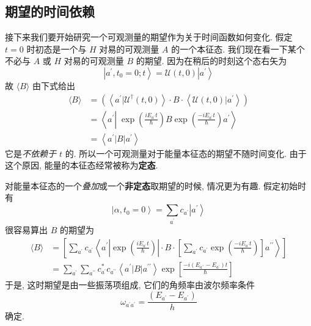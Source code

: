 \documentclass[lang=cn,newtx,10pt,scheme=chinese,thmcnt=section]{elegantbook}
\begin{document}
\subsection*{期望的时间依赖}
接下来我们要开始研究一个可观测量的期望作为关于时间函数如何变化. 假定 $t = 0$ 时初态是一个与 $H$ 对易的可观测量 $A$ 的一个本征态. 我们现在看一下某个不必与 $A$ 或 $H$ 对易的可观测量 $B$ 的期望. 因为在稍后的时刻这个态右矢为
\begin{equation}
	\left| {{a}^{\prime },{t}_{0} = 0;t}\right\rangle = \mathcal{U}\left( {t,0}\right) \left| {a}^{\prime }\right\rangle
\end{equation}
故 $\langle B\rangle$ 由下式给出
\begin{equation}
	\begin{aligned}
		\langle B\rangle &= \left( {\left\langle {{a}^{\prime } | {\mathcal{U}}^{\dagger}\left( {t,0}\right) }\right\rangle \cdot B \cdot \left\langle {\mathcal{U}\left( {t,0}\right) | {a}^{\prime }}\right\rangle }\right)\\
		&= \left\langle {{a}^{\prime }\left| {\;\exp \left( \frac{i{E}_{{a}^{\prime }}t}{\hbar }\right) B\exp \left( \frac{-i{E}_{{a}^{\prime }}t}{\hbar }\right) }\right. {a}^{\prime }}\right\rangle\\
		&= \left\langle {{a}^{\prime }\left| B\right| {a}^{\prime }}\right\rangle
	\end{aligned}
\end{equation}
它是\textit{不依赖于 $t$} 的. 所以一个可观测量对于能量本征态的期望不随时间变化. 由于这个原因, 能量的本征态经常被称为\textbf{定态}.

对能量本征态的一个\textit{叠加}或一个\textbf{非定态}取期望的时候, 情况更为有趣. 假定初始时有
\begin{equation}
	\left| {\alpha ,{t}_{0} = 0}\right\rangle = \mathop{\sum }\limits_{{a}^{\prime }}{c}_{{a}^{\prime }}\left| {a}^{\prime }\right\rangle
\end{equation}
很容易算出 $B$ 的期望为
\begin{equation}
	\begin{aligned}
		\langle B\rangle &= \left\lbrack {\mathop{\sum }\limits_{{a}^{\prime }}{c}_{{a}^{\prime }}\left\langle {{a}^{\prime }\left| {\exp \left( \frac{i{E}_{{a}^{\prime }}t}{\hbar }\right) }\right| \cdot B \cdot \left\lbrack {\mathop{\sum }\limits_{{a}^{\prime }}{c}_{{a}^{\prime }}\exp \left( \frac{-i{E}_{{a}^{\prime }}t}{\hbar }\right) }\right\rbrack {a}^{\prime \prime }}\right\rangle }\right\rbrack\\
		&= \mathop{\sum }\limits_{{a}^{\prime }}\mathop{\sum }\limits_{{a}^{\prime \prime }}{c}_{{a}^{\prime }}^{ * }{c}_{{a}^{\prime \prime }}\left\langle {{a}^{\prime }\left| B\right| {a}^{\prime \prime }}\right\rangle \exp \left\lbrack \frac{-i\left( {{E}_{{a}^{\prime \prime }} - {E}_{{a}^{\prime }}}\right) t}{\hbar }\right\rbrack
	\end{aligned}
\end{equation}
于是, 这时期望是由一些振荡项组成, 它们的角频率由波尔频率条件
\begin{equation}
	{\omega }_{{a}^{\prime }{a}^{\prime }} = \frac{\left( {E}_{{a}^{\prime }} - {E}_{{a}^{\prime }}\right) }{h}
\end{equation}
确定.
\end{document}
